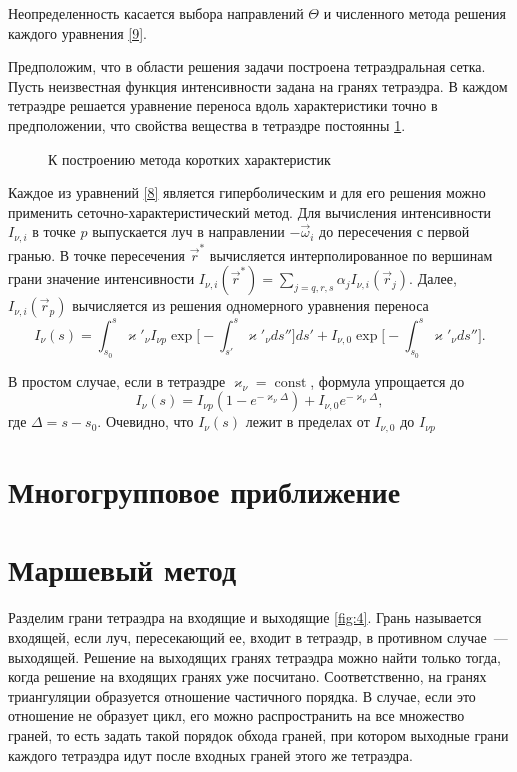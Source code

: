 Неопределенность касается выбора направлений $\Theta$ и численного метода решения каждого уравнения \eqref{9}.

Предположим, что в области решения задачи построена тетраэдральная сетка.
Пусть неизвестная функция интенсивности задана на гранях тетраэдра. В каждом тетраэдре решается уравнение переноса вдоль характеристики точно в предположении, что свойства вещества в тетраэдре постоянны \ref{fig:3}. 

\begin{figure}[ht!]
\caption{К построению метода коротких характеристик}
\label{fig:3}
\end{figure}

Каждое из уравнений \eqref{8} является гиперболическим и для его решения можно применить сеточно-характеристический метод. Для вычисления интенсивности $I_{\nu,i}$ в точке $p$ выпускается луч в направлении $-\vec\omega_i$ до пересечения с первой гранью. В точке пересечения $\vec r^*$ вычисляется интерполированное по вершинам грани значение интенсивности $I_{\nu, i} (\vec r^*) = \sum_{j = q,r,s} \alpha_jI_{\nu, i}(\vec r_j)$. Далее, $I_{\nu, i} (\vec r_p)$ вычисляется из решения одномерного уравнения переноса   
\begin {equation}
I_{\nu}(s) = \int_{s_0}^s\varkappa'_{\nu}I_{\nu p} \exp\Big[-\int_{s'}^s\varkappa'_{\nu}ds''\Big]ds' + I_{\nu,0} \exp\Big[-\int_{s_0}^s \varkappa'_{\nu}ds''\Big].
\end {equation}

В простом случае, если в тетраэдре $\varkappa_\nu = \operatorname{const}$, формула упрощается до 
\begin {equation}
I_\nu (s) = I_{\nu p} \left(1 - e^{-\varkappa_\nu \Delta}\right) + I_{\nu,0}e^{-\varkappa_\nu \Delta},
\end {equation}
где $\Delta = s - s_0$. Очевидно, что $I_\nu(s)$ лежит в пределах от $I_{\nu, 0}$ до $I_{\nu p}$
\section {Многогрупповое приближение}
\section{Маршевый метод}
Разделим грани тетраэдра на входящие и выходящие \ref{fig:4}. Грань называется входящей, если луч, пересекающий ее, входит в тетраэдр, в противном случае~--- выходящей. Решение на выходящих гранях тетраэдра можно найти только тогда, когда решение на входящих гранях уже посчитано. Соответственно, на гранях триангуляции образуется отношение частичного порядка. В случае, если это отношение не образует цикл, его можно распространить на все множество граней, то есть задать такой порядок обхода граней, при котором выходные грани каждого тетраэдра идут после входных граней этого же тетраэдра. 

